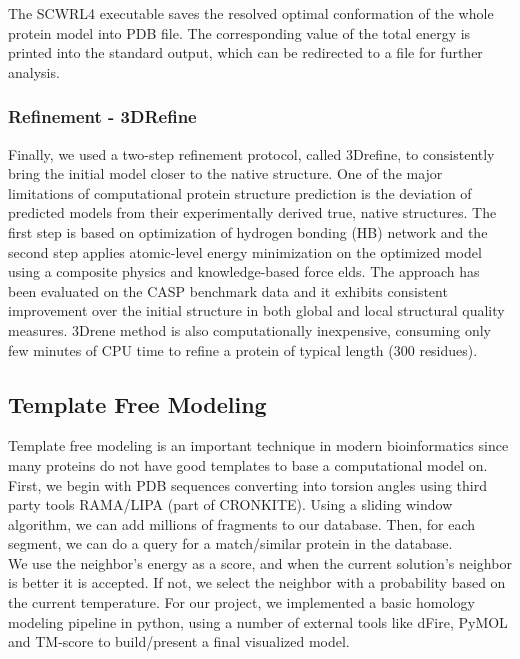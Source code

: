 \documentclass{article}
\begin{document}
The SCWRL4 executable saves the resolved optimal conformation of the whole protein model into PDB file. The corresponding value of the total energy is printed into the standard output, which can be redirected to a file for further analysis.


\subsubsection*{Refinement - 3DRefine}

Finally, we used a two-step refinement protocol, called 3Drefine, to consistently bring the initial model closer to the native structure. One of the major limitations of computational protein structure prediction is the deviation of predicted models from their experimentally derived true, native structures. The first step is based on optimization of hydrogen bonding (HB) network and the second step applies atomic-level energy minimization on the optimized model using a composite physics and knowledge-based force elds. The approach has been evaluated on the CASP benchmark data and it exhibits consistent improvement over the initial structure in both global and local structural quality measures. 3Drene method is also computationally inexpensive, consuming only few minutes of CPU time to refine a protein of typical length (300 residues).


\subsection{Template Free Modeling}

Template free modeling is an important technique in modern bioinformatics since many proteins do not have good templates to base a computational model on. First, we begin with PDB sequences converting into torsion angles using third party tools RAMA/LIPA (part of CRONKITE). Using a sliding window algorithm, we can add millions of fragments to our database. Then, for each segment, we can do a query for a match/similar protein in the database.\\

We use the neighbor's energy as a score, and when the current solution’s neighbor is better it is accepted. If not, we select the neighbor with a probability based on the current temperature. For our project, we implemented a basic homology modeling pipeline in python, using a number of external tools like dFire, PyMOL and TM-score to build/present a final visualized model.\\
\end{document}
